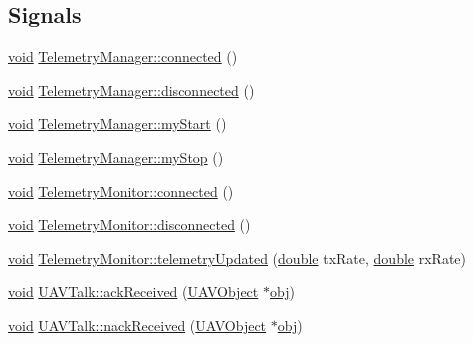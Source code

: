 \subsection*{Signals}
\begin{DoxyCompactItemize}
\item 
\hyperlink{group___u_a_v_objects_plugin_ga444cf2ff3f0ecbe028adce838d373f5c}{void} \hyperlink{group___u_a_v_talk_plugin_ga54bec8ecfe469710c7261f567e76c5f0}{Telemetry\-Manager\-::connected} ()
\item 
\hyperlink{group___u_a_v_objects_plugin_ga444cf2ff3f0ecbe028adce838d373f5c}{void} \hyperlink{group___u_a_v_talk_plugin_ga61e671949cc2403327617d9c9a372a76}{Telemetry\-Manager\-::disconnected} ()
\item 
\hyperlink{group___u_a_v_objects_plugin_ga444cf2ff3f0ecbe028adce838d373f5c}{void} \hyperlink{group___u_a_v_talk_plugin_gabb52305ac7bcf975fd60517b0dc9a148}{Telemetry\-Manager\-::my\-Start} ()
\item 
\hyperlink{group___u_a_v_objects_plugin_ga444cf2ff3f0ecbe028adce838d373f5c}{void} \hyperlink{group___u_a_v_talk_plugin_gabbe5997234dbee93471fcef62361d276}{Telemetry\-Manager\-::my\-Stop} ()
\item 
\hyperlink{group___u_a_v_objects_plugin_ga444cf2ff3f0ecbe028adce838d373f5c}{void} \hyperlink{group___u_a_v_talk_plugin_gac4e867b78642d4f1fe27c5fc97468ce7}{Telemetry\-Monitor\-::connected} ()
\item 
\hyperlink{group___u_a_v_objects_plugin_ga444cf2ff3f0ecbe028adce838d373f5c}{void} \hyperlink{group___u_a_v_talk_plugin_ga8445fbd983df4d054bb798c760ba0640}{Telemetry\-Monitor\-::disconnected} ()
\item 
\hyperlink{group___u_a_v_objects_plugin_ga444cf2ff3f0ecbe028adce838d373f5c}{void} \hyperlink{group___u_a_v_talk_plugin_gac7898d4b74305c568adefb289da72ebc}{Telemetry\-Monitor\-::telemetry\-Updated} (\hyperlink{_super_l_u_support_8h_a8956b2b9f49bf918deed98379d159ca7}{double} tx\-Rate, \hyperlink{_super_l_u_support_8h_a8956b2b9f49bf918deed98379d159ca7}{double} rx\-Rate)
\item 
\hyperlink{group___u_a_v_objects_plugin_ga444cf2ff3f0ecbe028adce838d373f5c}{void} \hyperlink{group___u_a_v_talk_plugin_ga2d657cf81a725bce5e859eb6828cf80c}{U\-A\-V\-Talk\-::ack\-Received} (\hyperlink{class_u_a_v_object}{U\-A\-V\-Object} $\ast$\hyperlink{glext_8h_a0c0d4701a6c89f4f7f0640715d27ab26}{obj})
\item 
\hyperlink{group___u_a_v_objects_plugin_ga444cf2ff3f0ecbe028adce838d373f5c}{void} \hyperlink{group___u_a_v_talk_plugin_gac0268d5005ed3241192bae731c362f7e}{U\-A\-V\-Talk\-::nack\-Received} (\hyperlink{class_u_a_v_object}{U\-A\-V\-Object} $\ast$\hyperlink{glext_8h_a0c0d4701a6c89f4f7f0640715d27ab26}{obj})
\end{DoxyCompactItemize}
